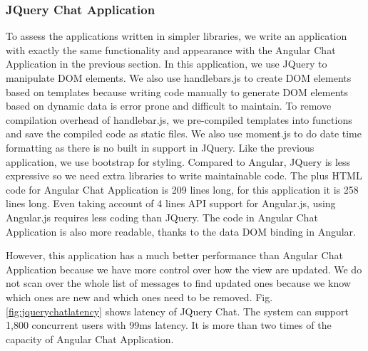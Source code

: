 \angularchatlatency{}

\subsubsection{JQuery Chat Application}
\label{sec:jquery}
To assess the applications written in simpler \js{} libraries,
we write an application with exactly the same functionality and 
appearance with the Angular Chat Application in the previous section.
In this application, we use JQuery to manipulate DOM elements.
We also use handlebars.js to create DOM elements based on templates
because writing code manually to generate DOM elements based on dynamic data 
is error prone and difficult to maintain.
To remove compilation overhead of handlebar.js, 
we pre-compiled templates into \js{} functions and save the compiled code as static files.
We also use moment.js to do date time formatting as there is no built in support 
in JQuery.
Like the previous application, we use bootstrap for styling.
Compared to Angular, JQuery is less expressive so we need
extra libraries to write maintainable code.
The \js{} plus HTML code for Angular Chat Application is 209 lines long,
for this application it is 258 lines long.
Even taking account of 4 lines API support for Angular.js, 
using Angular.js requires less coding than JQuery.
The code in Angular Chat Application is also more readable,
thanks to the data DOM binding in Angular.

However, this application has a much better performance than Angular 
Chat Application because we have more control over how the view
are updated.
We do not scan over the whole list of messages to find updated ones
because we know which ones are new and which ones need to be removed.
Fig.\ref{fig:jquerychatlatency} shows latency of JQuery Chat.
The system can support 1,800 concurrent users with 99ms latency.
It is more than two times of the capacity of Angular Chat Application.

\jquerychatlatency{}


